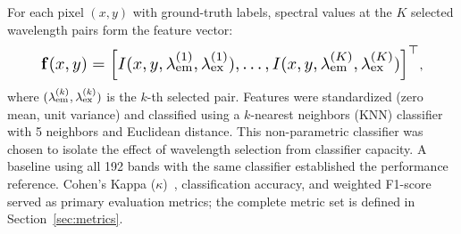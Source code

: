 For each pixel $(x, y)$ with ground-truth labels, spectral values at the $K$ selected wavelength pairs form the feature vector:
\begin{equation}
\resizebox{0.88\columnwidth}{!}{$
\vect{f}(x, y) = \left[ I(x, y, \lambda_{\mathrm{em}}^{(1)}, \lambda_{\mathrm{ex}}^{(1)}), \ldots, I(x, y, \lambda_{\mathrm{em}}^{(K)}, \lambda_{\mathrm{ex}}^{(K)}) \right]^\top$},
\label{eq:features}
\end{equation}
where $(\lambda_{\text{em}}^{(k)}, \lambda_{\text{ex}}^{(k)})$ is the $k$-th selected pair.
Features were standardized (zero mean, unit variance) and classified using a $k$-nearest neighbors (KNN) classifier~\cite{cover1967nearest} with 5 neighbors and Euclidean distance.
This non-parametric classifier was chosen to isolate the effect of wavelength selection from classifier capacity.
A baseline using all 192 bands with the same classifier established the performance reference.
Cohen's Kappa ($\kappa$)~\cite{cohen1960coefficient}, classification accuracy, and weighted F1-score served as primary evaluation metrics; the complete metric set is defined in Section~\ref{sec:metrics}.